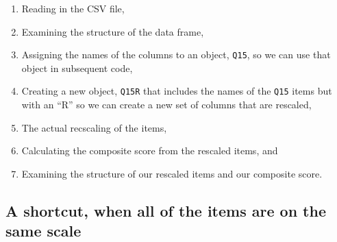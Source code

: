 \documentclass[
]{article}
\newenvironment{Shaded}{\begin{snugshade}}{\end{snugshade}}
\newcommand{\DataTypeTok}[1]{\textcolor[rgb]{0.13,0.29,0.53}{#1}}
\newcommand{\DecValTok}[1]{\textcolor[rgb]{0.00,0.00,0.81}{#1}}
\newcommand{\KeywordTok}[1]{\textcolor[rgb]{0.13,0.29,0.53}{\textbf{#1}}}
\newcommand{\NormalTok}[1]{#1}
\newcommand{\OperatorTok}[1]{\textcolor[rgb]{0.81,0.36,0.00}{\textbf{#1}}}
\newcommand{\OtherTok}[1]{\textcolor[rgb]{0.56,0.35,0.01}{#1}}
\newcommand{\StringTok}[1]{\textcolor[rgb]{0.31,0.60,0.02}{#1}}
\providecommand{\tightlist}{%
  \setlength{\itemsep}{0pt}\setlength{\parskip}{0pt}}
\begin{document}
\begin{enumerate}
\def\labelenumi{\arabic{enumi}.}
\tightlist
\item
  Reading in the CSV file,
\item
  Examining the structure of the data frame,
\item
  Assigning the names of the columns to an object, \texttt{Q15}, so we can use that object in subsequent code,
\item
  Creating a new object, \texttt{Q15R} that includes the names of the \texttt{Q15} items but with an ``R'' so we can create a new set of columns that are rescaled,
\item
  The actual recscaling of the items,
\item
  Calculating the composite score from the rescaled items, and
\item
  Examining the structure of our rescaled items and our composite score.
\end{enumerate}

\begin{Shaded}
\end{Shaded}

\hypertarget{a-shortcut-when-all-of-the-items-are-on-the-same-scale}{%
\subsection{A shortcut, when all of the items are on the same scale}\label{a-shortcut-when-all-of-the-items-are-on-the-same-scale}}
\end{document}
